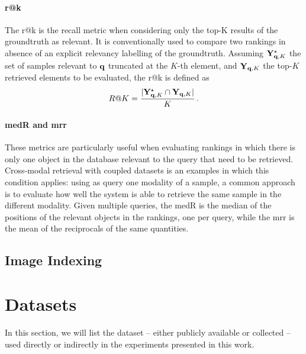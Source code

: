 
\paragraph{\acrlong{r@k}}
The \acrfull{r@k} is the recall metric when considering only the top-K results of the groundtruth as relevant.
It is conventionally used to compare two rankings in absence of an explicit relevancy labelling of the groundtruth.
Assuming $\mathbf{Y}^{\star}_{\mathbf{q}, K}$ the set of samples relevant to $\mathbf{q}$ truncated at the $K$-th element, and $\mathbf{Y}_{\mathbf{q},K}$ the top-$K$ retrieved elements to be evaluated, the \gls{r@k} is defined as
\begin{equation} \label{eq:back:r@k}
    R@K = \frac{|\mathbf{Y}^{\star}_{\mathbf{q}, K} \cap \mathbf{Y}_{\mathbf{q},K}|}{K} \,.
\end{equation}

\paragraph{\acrlong{medR} and \acrlong{mrr}}
These metrics are particularly useful when evaluating rankings in which there is only one object in the database relevant to the query that need to be retrieved.
Cross-modal retrieval with coupled datasets is an examples in which this condition applies: using as query one modality of a sample, a common approach is to evaluate how well the system is able to retrieve the same sample in the different modality.
Given multiple queries, the \acrfull{medR} is the median of the positions of the relevant objects in the rankings, one per query,
while the \acrfull{mrr} is the mean of the reciprocals of the same quantities.


\subsection{Image Indexing}


\section{Datasets}
\label{sec:back:datasets}
In this section, we will list the dataset -- either publicly available or collected -- used directly or indirectly in the experiments presented in this work.

